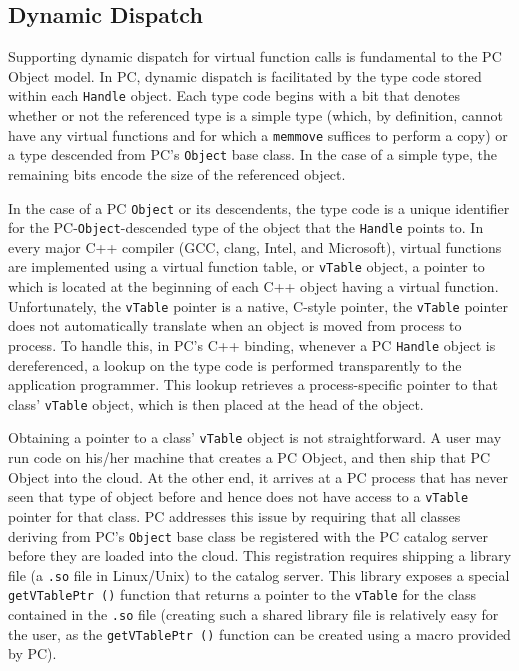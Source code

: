 \subsection{Dynamic Dispatch}
\label{sec:dyn_dis}

Supporting dynamic dispatch for virtual function calls is fundamental to the PC Object model.
In PC, dynamic dispatch is facilitated by the type code stored within each
\texttt{Handle} object.
Each type code begins with a bit that denotes whether or not the referenced type is a simple type (which, by definition, cannot have any
virtual functions and for which a \texttt{memmove} suffices to perform a copy) or a type descended from PC's \texttt{Object} base class.
In the case of a simple type, the remaining bits encode the size of the referenced object.  

In the case of a PC \texttt{Object} or its descendents, the
type code is a unique identifier for the PC-\texttt{Object}-descended type of the object that the \texttt{Handle} points to.
In every major C++ compiler (GCC, clang, Intel, and Microsoft), virtual functions
are implemented using a virtual function table, or \texttt{vTable} object, a pointer to which is located at the beginning
of each C++ object having a virtual function.  Unfortunately, the \texttt{vTable} pointer is a native, C-style pointer, the
\texttt{vTable} pointer does not automatically translate when an
object is moved from process to process.  To handle this, in
PC's C++ binding, whenever a PC \texttt{Handle} object is dereferenced, 
a lookup on the
type code is performed transparently to the application programmer.  This lookup retrieves a process-specific pointer to that class' \texttt{vTable} object, which is
then placed at the head of the object.

Obtaining a pointer to a class' \texttt{vTable} object is not straightforward.
A user may run code on his/her machine that creates
a PC Object, and then ship that PC Object into the cloud.  At the other end, it arrives at a PC process that has never seen that type of object before and hence
does not have access to a \texttt{vTable} pointer for that class.
PC addresses this issue by requiring that all classes deriving from PC's \texttt{Object} base class be registered with the PC catalog
server before they are loaded into the cloud.  This registration requires shipping a library file (a \texttt{.so} file in Linux/Unix) to
the catalog server.  This library exposes a special \texttt{getVTablePtr ()} function that returns a pointer to the \texttt{vTable} for the class contained
in the \texttt{.so} file (creating such
a shared library file is relatively easy for the user, as the \texttt{getVTablePtr ()} function can be created using a macro provided by PC).

